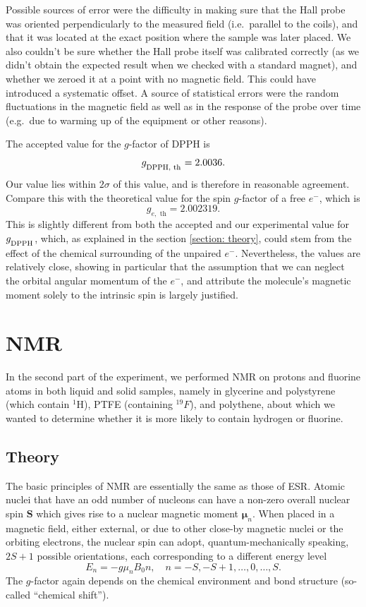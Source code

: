 \documentclass[a4paper]{jpconf}
\numberwithin{equation}{section}
\begin{document}
Possible sources of error were the difficulty in making sure that the Hall probe was oriented perpendicularly to the measured field (i.e.\ parallel to the coils), and that it was located at the exact position where the sample was later placed. We also couldn't be sure whether the Hall probe itself was calibrated correctly (as we didn't obtain the expected result when we checked with a standard magnet), and whether we zeroed it at a point with no magnetic field. This could have introduced a systematic offset. A source of statistical errors were the random fluctuations in the magnetic field as well as in the response of the probe over time (e.g.\ due to warming up of the equipment or other reasons).

The accepted value for the $g$-factor of DPPH is
\[
	g_{\textsubscript{DPPH, th}} = 2.0036.
\]
Our value lies within $2\sigma$ of this value, and is therefore in reasonable agreement.
Compare this with the theoretical value for the spin $g$-factor of a free $e^-$, which is
\[
	g_{e,\text{ th}} = 2.002319.
\]
This is slightly different from both the accepted and our experimental value for $g_{\textsubscript{DPPH}}$, which, as explained in the section \ref{section: theory}, could stem from the effect of the chemical surrounding of the unpaired $e^-$. Nevertheless, the values are relatively close, showing in particular that the assumption that we can neglect the orbital angular momentum of the $e^-$, and attribute the molecule's magnetic moment solely to the intrinsic spin is largely justified.


\section{NMR} 
In the second part of the experiment, we performed NMR on protons and fluorine atoms in both liquid and solid samples, namely in glycerine and polystyrene (which contain ${}^1$H), PTFE (containing ${}^{19}F$), and polythene, about which we wanted to determine whether it is more likely to contain hydrogen or fluorine.
\subsection{Theory}

The basic principles of NMR are essentially the same as those of ESR. Atomic nuclei that have an odd number of nucleons can have a non-zero overall nuclear spin $\mathbf{S}$ which gives rise to a nuclear magnetic moment $\bm{\mu}_n$. When placed in a magnetic field, either external, or due to other close-by magnetic nuclei or the orbiting electrons, the nuclear spin can adopt, quantum-mechanically speaking, $2S + 1$ possible orientations, each corresponding to a different energy level
\[
	E_n = -g \mu_n B_0 n, \quad n = -S, -S+1, \dots, 0, \dots, S. 
\] 
The $g$-factor again depends on the chemical environment and bond structure (so-called ``chemical shift''). 
\end{document}
